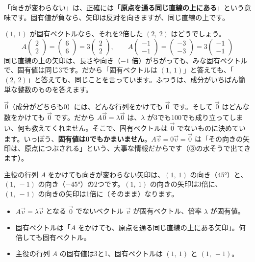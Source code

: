 「向きが変わらない」は、正確には「\textbf{原点を通る同じ直線の上にある}」という意味です。固有値が負なら、矢印は反対を向きますが、同じ直線の上です。

$(1,\ 1)$ が固有ベクトルなら、それを2倍した $(2,\ 2)$ はどうでしょう。
\[ A\begin{pmatrix}2\\2\end{pmatrix}=\begin{pmatrix}6\\6\end{pmatrix}=3\begin{pmatrix}2\\2\end{pmatrix},\qquad A\begin{pmatrix}-1\\-1\end{pmatrix}=\begin{pmatrix}-3\\-3\end{pmatrix}=3\begin{pmatrix}-1\\-1\end{pmatrix} \]
同じ直線の上の矢印は、長さや向き（$-1$ 倍）がちがっても、みな固有ベクトルで、固有値は同じ3です。だから「固有ベクトルは $(1,\ 1)$」と答えても、「$(2,\ 2)$」と答えても、同じことを言っています。ふつうは、成分がいちばん簡単な整数のものを答えます。

$\vec 0$（成分がどちらも0）には、どんな行列をかけても $\vec 0$ です。そして $\vec 0$ はどんな数をかけても $\vec 0$ です。だから $A\vec 0=\lambda\vec 0$ は、$\lambda$ が3でも100でも成り立ってしまい、何も教えてくれません。そこで、固有ベクトルは $\vec 0$ でないものに決めています。いっぽう、\textbf{固有値は0でもかまいません}。$A\vec v=0\vec v=\vec 0$ は「その向きの矢印は、原点につぶされる」という、大事な情報だからです（③の水そうで出てきます）。

主役の行列 $A$ をかけても向きが変わらない矢印は、$(1,\ 1)$ の向き（$45°$）と、$(1,\ -1)$ の向き（$-45°$）の2つです。$(1,\ 1)$ の向きの矢印は3倍に、$(1,\ -1)$ の向きの矢印は1倍に（そのまま）なります。

\begin{taisetsu}
\begin{itemize}[leftmargin=1.2\zw, itemsep=2pt, topsep=0pt, label={\color{\bkTT}●}]
\item $A\vec v=\lambda\vec v$ となる $\vec 0$ でないベクトル $\vec v$ が固有ベクトル、倍率 $\lambda$ が固有値。
\item 固有ベクトルは「$A$ をかけても、原点を通る同じ直線の上にある矢印」。何倍しても固有ベクトル。
\item 主役の行列 $A$ の固有値は3と1、固有ベクトルは $(1,\ 1)$ と $(1,\ -1)$。
\end{itemize}
\end{taisetsu}



